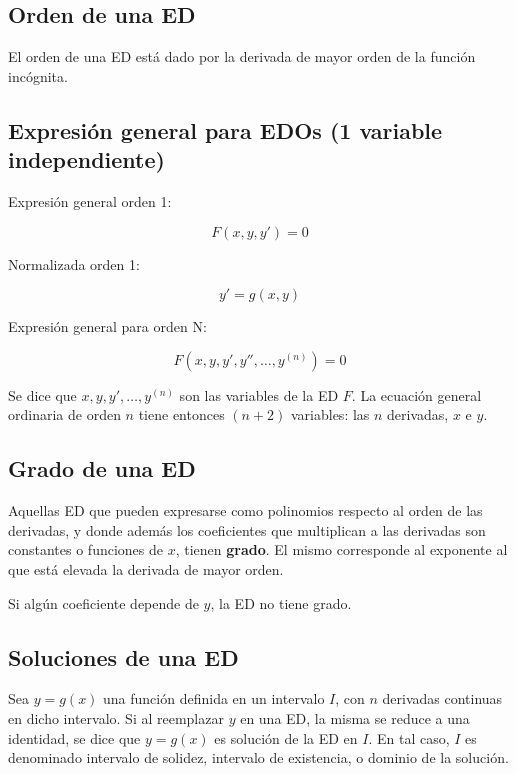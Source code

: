\documentclass{article}
\begin{document}
\subsection{Orden de una ED}

El orden de una ED está dado por la derivada de mayor orden de la función incógnita.

\subsection{Expresión general para EDOs (1 variable independiente)}

Expresión general orden 1:

\begin{equation}
F(x, y, y') = 0
\end{equation}

Normalizada orden 1:

\begin{equation}
y' = g(x, y)
\end{equation}

Expresión general para orden N:

\begin{equation}
F(x, y, y', y'', \ldots, y^{(n)}) = 0
\end{equation}

Se dice que $x, y, y', \ldots, y^{(n)}$ son las variables de la ED $F$. La ecuación general ordinaria de orden $n$ tiene entonces $(n+2)$ variables: las $n$ derivadas, $x$ e $y$.

\subsection{Grado de una ED}

Aquellas ED que pueden expresarse como polinomios respecto al orden de las derivadas, y donde además los coeficientes que multiplican a las derivadas son constantes o funciones de $x$, tienen \textbf{grado}. El mismo corresponde al exponente al que está elevada la derivada de mayor orden.

Si algún coeficiente depende de $y$, la ED no tiene grado.

\subsection{Soluciones de una ED}

Sea $y = g(x)$ una función definida en un intervalo $I$, con $n$ derivadas continuas en dicho intervalo. Si al reemplazar $y$ en una ED, la misma se reduce a una identidad, se dice que $y = g(x)$ es solución de la ED en $I$. En tal caso, $I$ es denominado intervalo de solidez, intervalo de existencia, o dominio de la solución.
\end{document}
